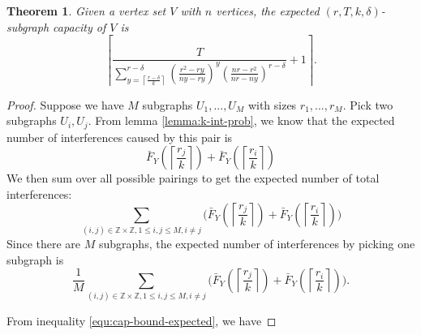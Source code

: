 \documentclass[10pt]{extarticle}
\newcommand{\Z}{\mathbb{Z}}
\newtheorem{theorem}{Theorem}
\theoremstyle{definition}
\begin{document}
\begin{theorem}
    Given a vertex set $V$ with $n$ vertices, the expected $(r,T,k,\delta)$-subgraph capacity of $V$ is 
    \begin{equation*}
        \left\lceil \frac{T}{\sum_{y = \left\lceil \frac{r-\delta}{k} \right\rceil}^{r-\delta}
        \left(\frac{r^2 - ry}{ny-ry}\right)^{y} \left(\frac{nr-r^2}{nr-ny}\right)^{r-\delta}} + 1 \right\rceil.
    \end{equation*}
\end{theorem}

\begin{proof}
    Suppose we have $M$ subgraphs $U_1,...,U_M$ with sizes $r_1,...,r_M$. Pick two subgraphs $U_i,U_j$. From lemma \ref{lemma:k-int-prob}, we know that the expected number of interferences caused by this pair is
    $$
    \bar{F}_Y\left(\left\lceil \frac{r_j}{k} \right\rceil\right) + \bar{F}_Y\left(\left\lceil \frac{r_i}{k} \right\rceil\right)
    $$
    We then sum over all possible pairings to get the expected number of total interferences:
    $$
    \sum_{(i,j) \in \Z\times\Z, 1 \le i,j \le M, i \ne j} \Biggl( \bar{F}_Y\left(\left\lceil \frac{r_j}{k} \right\rceil\right) + \bar{F}_Y\left(\left\lceil \frac{r_i}{k} \right\rceil\right) \Biggr)
    $$
    Since there are $M$ subgraphs, the expected number of interferences by picking one subgraph is
    $$
    \frac{1}{M} \sum_{(i,j) \in \Z\times\Z, 1 \le i,j \le M, i \ne j}  \Biggl( \bar{F}_Y\left(\left\lceil \frac{r_j}{k} \right\rceil\right) + \bar{F}_Y\left(\left\lceil \frac{r_i}{k} \right\rceil\right) \Biggr).
    $$

\noindent From inequality \ref{equ:cap-bound-expected}, we have 


\end{proof}
\end{document}
